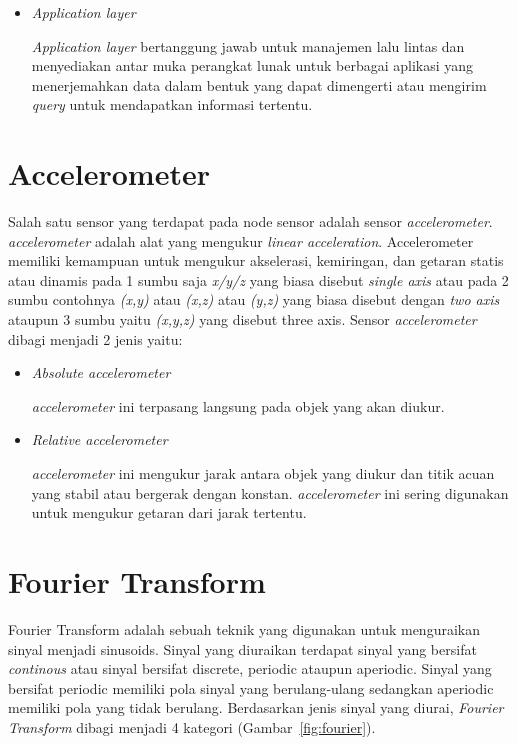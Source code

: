 \begin{itemize}
	\item \textit{Application layer}
	
	\textit{Application layer} bertanggung jawab untuk manajemen lalu lintas dan menyediakan antar muka perangkat lunak untuk berbagai aplikasi yang menerjemahkan data dalam bentuk yang dapat dimengerti atau mengirim \textit{query} untuk mendapatkan informasi tertentu.
\end{itemize}

\section{Accelerometer \cite{fft}}
\label{accelerometer}
Salah satu sensor yang terdapat pada node sensor adalah sensor \textit{accelerometer}. \textit{accelerometer} adalah alat yang mengukur \textit{linear acceleration}. Accelerometer memiliki kemampuan untuk mengukur akselerasi, kemiringan, dan getaran statis atau dinamis pada 1 sumbu saja \textit{x/y/z} yang biasa disebut \textit{single axis} atau pada 2 sumbu contohnya \textit{(x,y)} atau \textit{(x,z)} atau \textit{(y,z)} yang biasa disebut dengan \textit{two axis} ataupun 3 sumbu yaitu \textit{(x,y,z)} yang disebut three axis. Sensor \textit{accelerometer} dibagi menjadi 2 jenis yaitu:

\begin{itemize}
	\item \textit{Absolute accelerometer}
	
	\textit{accelerometer} ini terpasang langsung pada objek yang akan diukur.
	
	\item \textit{Relative accelerometer}
	
	\textit{accelerometer} ini mengukur jarak antara objek yang diukur dan titik acuan yang stabil atau bergerak dengan konstan. \textit{accelerometer} ini sering digunakan untuk mengukur getaran dari jarak tertentu.	
\end{itemize}

\section{Fourier Transform}
Fourier Transform adalah sebuah teknik yang digunakan untuk menguraikan sinyal menjadi sinusoids. Sinyal yang diuraikan terdapat sinyal yang bersifat \textit{continous} atau sinyal bersifat discrete, periodic ataupun aperiodic. Sinyal yang bersifat periodic memiliki pola sinyal yang berulang-ulang sedangkan aperiodic memiliki pola yang tidak berulang. Berdasarkan jenis sinyal yang diurai, \textit{Fourier Transform} dibagi menjadi 4 kategori (Gambar~\ref{fig:fourier}).

